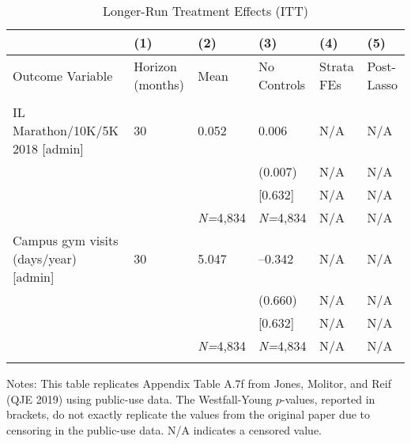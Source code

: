 \documentclass{article}
\begin{document}
\setlength{\tabcolsep}{6pt}
\begin{table}[tbp] \centering
{}

\caption{Longer-Run Treatment Effects (ITT)}
\label{tab:appendix_itt_health_vars_admin_0816_0119}
{\scriptsize
\begin{tabularx}{\linewidth}{lCCCCC}

\toprule
&{(1)}&{(2)}&{(3)}&{(4)}&{(5)} \tabularnewline \midrule
{Outcome Variable}&{Horizon (months)}&{Mean}&{No Controls}&{Strata FEs}&{Post-Lasso} \tabularnewline
\midrule 
\addlinespace[1.4ex]
& \tabularnewline
\midrule IL Marathon/10K/5K 2018 [admin]&30&0.052&0.006&N/A&N/A \tabularnewline
&&&(0.007)&N/A&N/A \tabularnewline
&&&[0.632]&N/A&N/A \tabularnewline
&&\textit{N=}4,834&\textit{N=}4,834&N/A&N/A \tabularnewline
\addlinespace[1.4ex]
Campus gym visits (days/year) [admin]&30&5.047&--0.342&N/A&N/A \tabularnewline
&&&(0.660)&N/A&N/A \tabularnewline
&&&[0.632]&N/A&N/A \tabularnewline
&&\textit{N=}4,834&\textit{N=}4,834&N/A&N/A \tabularnewline
\bottomrule\addlinespace[-1.5ex] 

\end{tabularx}
\begin{flushleft}
\footnotesize Notes: This table replicates Appendix Table A.7f from Jones, Molitor, and Reif (QJE 2019) using public-use data. The Westfall-Young \(p\)-values, reported in brackets, do not exactly replicate the values from the original paper due to censoring in the public-use data. N/A indicates a censored value.
\end{flushleft}
}
\end{table}
\end{document}
